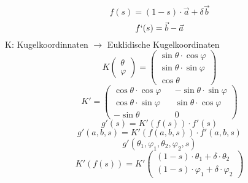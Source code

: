 \begin{equation}
f(s)=(1-s)\cdot\vec{a}+\delta\vec{b}
\end{equation}
\begin{equation}
    f`(s)=\vec{b}-\vec{a}
\end{equation}
K: Kugelkoordinnaten $\rightarrow$ Euklidische Kugelkoordinaten\\
\begin{equation*}
    K \begin{pmatrix}\theta \\ \varphi\end{pmatrix}=
    \begin{pmatrix}
        \sin\theta\cdot\cos\varphi \\
        \sin\theta\cdot\sin\varphi \\
        \cos\theta
    \end{pmatrix}
\end{equation*}
\begin{equation}
    K'=
    \begin{pmatrix}
       \cos\theta\cdot\cos\varphi && -\sin\theta\cdot\sin\varphi \\
       \cos\theta\cdot\sin\varphi && \sin\theta\cdot\cos\varphi \\
       -\sin\theta && 0
    \end{pmatrix}
\end{equation}
\begin{equation}
    g'(s) = K'(f(s))\cdot f'(s)
\end{equation}
\begin{equation}
    g'(a,b,s) = K'(f(a,b,s))\cdot f'(a,b,s)
\end{equation}
\begin{equation}
    g'(\theta_1,\varphi_1,\theta_2,\varphi_2,s)
\end{equation}
\begin{equation}
    K'(f(s))=K'
    \begin{pmatrix}
        (1-s)\cdot\theta_1 + \delta\cdot\theta_2 \\
        (1-s)\cdot\varphi_1 + \delta\cdot\varphi_2
    \end{pmatrix}
\end{equation}

